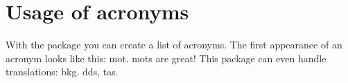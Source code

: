 \cleardoublepage
\chapter{Usage of acronyms}\label{app:zernike}

With the  package you can create a list of acronyms. The first appearance of an acronym looks like this: \gls{mot}. \Glspl{mot} are great! This package can even handle translations: \Gls{bkg}. \Gls{dds}, \glspl{ta}.